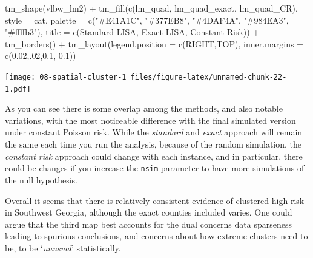 \documentclass[
]{book}
\newenvironment{Shaded}{\begin{snugshade}}{\end{snugshade}}
\newcommand{\AttributeTok}[1]{\textcolor[rgb]{0.77,0.63,0.00}{#1}}
\newcommand{\DecValTok}[1]{\textcolor[rgb]{0.00,0.00,0.81}{#1}}
\newcommand{\FloatTok}[1]{\textcolor[rgb]{0.00,0.00,0.81}{#1}}
\newcommand{\FunctionTok}[1]{\textcolor[rgb]{0.00,0.00,0.00}{#1}}
\newcommand{\NormalTok}[1]{#1}
\newcommand{\SpecialCharTok}[1]{\textcolor[rgb]{0.00,0.00,0.00}{#1}}
\newcommand{\StringTok}[1]{\textcolor[rgb]{0.31,0.60,0.02}{#1}}
\begin{document}
\begin{Shaded}
\begin{Highlighting}[]
\FunctionTok{tm\_shape}\NormalTok{(vlbw\_lm2) }\SpecialCharTok{+} 
  \FunctionTok{tm\_fill}\NormalTok{(}\FunctionTok{c}\NormalTok{(}\StringTok{\textquotesingle{}lm\_quad\textquotesingle{}}\NormalTok{, }\StringTok{\textquotesingle{}lm\_quad\_exact\textquotesingle{}}\NormalTok{, }\StringTok{\textquotesingle{}lm\_quad\_CR\textquotesingle{}}\NormalTok{),}
          \AttributeTok{style =} \StringTok{\textquotesingle{}cat\textquotesingle{}}\NormalTok{,}
          \AttributeTok{palette =} \FunctionTok{c}\NormalTok{(}\StringTok{"\#E41A1C"}\NormalTok{, }\StringTok{"\#377EB8"}\NormalTok{, }\StringTok{"\#4DAF4A"}\NormalTok{, }\StringTok{"\#984EA3"}\NormalTok{, }\StringTok{"\#ffffb3"}\NormalTok{),}
          \AttributeTok{title =} \FunctionTok{c}\NormalTok{(}\StringTok{\textquotesingle{}Standard LISA\textquotesingle{}}\NormalTok{, }\StringTok{\textquotesingle{}Exact LISA\textquotesingle{}}\NormalTok{, }\StringTok{\textquotesingle{}Constant Risk\textquotesingle{}}\NormalTok{)) }\SpecialCharTok{+}
  \FunctionTok{tm\_borders}\NormalTok{() }\SpecialCharTok{+}
  \FunctionTok{tm\_layout}\NormalTok{(}\AttributeTok{legend.position =} \FunctionTok{c}\NormalTok{(}\StringTok{\textquotesingle{}RIGHT\textquotesingle{}}\NormalTok{,}\StringTok{\textquotesingle{}TOP\textquotesingle{}}\NormalTok{),}
            \AttributeTok{inner.margins =} \FunctionTok{c}\NormalTok{(}\FloatTok{0.02}\NormalTok{,.}\DecValTok{02}\NormalTok{,}\FloatTok{0.1}\NormalTok{, }\FloatTok{0.1}\NormalTok{))}
\end{Highlighting}
\end{Shaded}

\texttt{[image: 08-spatial-cluster-1\_files/figure-latex/unnamed-chunk-22-1.pdf]}

As you can see there is some overlap among the methods, and also notable variations, with the most noticeable difference with the final simulated version under constant Poisson risk. While the \emph{standard} and \emph{exact} approach will remain the same each time you run the analysis, because of the random simulation, the \emph{constant risk} approach could change with each instance, and in particular, there could be changes if you increase the \texttt{nsim} parameter to have more simulations of the null hypothesis.

Overall it seems that there is relatively consistent evidence of clustered high risk in Southwest Georgia, although the exact counties included varies. One could argue that the third map best accounts for the dual concerns data sparseness leading to spurious conclusions, and concerns about how extreme clusters need to be, to be `\emph{unusual}' statistically.
\end{document}
